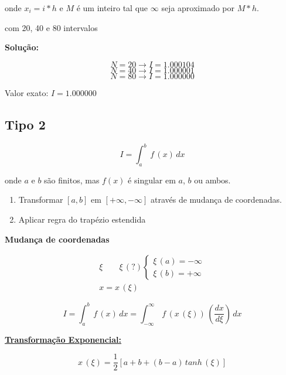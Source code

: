 onde $x_{i} = i \ast h$ e $M$ é um inteiro tal que $\infty$ seja aproximado por $M \ast h$.

\begin{example}
  com 20, 40 e 80 intervalos

\textbf{Solução:} 

\[N = 20 \rightarrow I = 1.000104\]
\[N = 40 \rightarrow I = 1.000001\]
\[N = 80 \rightarrow I = 1.000000\]

Valor exato: $I = 1.000000$
\end{example}

\subsection{Tipo 2}

\[
 I = \int_a^b \, f\,(x) \, dx
\]

onde $a$ e $b$ são finitos, mas $f(x)$ é singular em $a$, $b$ ou ambos.

\begin{enumerate}

\item 
Transformar $[a,b]$ em $[+\infty,-\infty]$ através de mudança de coordenadas.

\item
Aplicar regra do trapézio estendida

\end{enumerate}

\textbf{Mudança de coordenadas}

\[
 \begin{array}{l}
 \xi \qquad \xi\,(?)
 \left\{
 \begin{array}{l}
  \xi\,(a) = - \infty \\
  \xi\,(b) = + \infty
 \end{array}
 \right. \\
 x = x\,(\xi)
 \end{array}
\]

\begin{equation}
 \label{cap2:sec8:eq1}
 I = \int_a^b \, f\,(x) \, dx = \int_{-\infty}^\infty \, f\,(x\,(\xi)) \, \left( \frac{dx}{d\xi} \right) \, dx
\end{equation}

\underline{\textbf{Transformação Exponencial:}}

\begin{equation}
 \label{cap2:sec8:eq2}
 x\,(\xi) = \frac{1}{2} \left[ a + b + (b - a) \, tanh\,(\xi) \right]
\end{equation}

